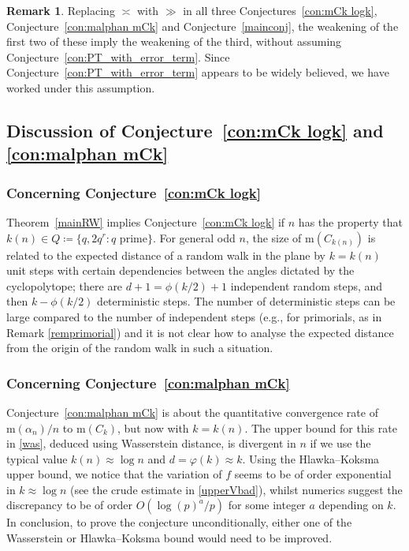 \documentclass[12pt,reqno]{amsart}
\theoremstyle{definition}
\theoremstyle{plain}
\theoremstyle{definition}
\newtheorem{remark}[theorem]{Remark}
\newcommand\m{\mathrm{m}}
\begin{document}
\begin{remark} Replacing $\asymp$ with $\gg$ in all three Conjectures~\ref{con:mCk logk}, Conjecture~\ref{con:malphan mCk} and Conjecture~\ref{mainconj}, the weakening of the first two of these imply the weakening of the third, without assuming Conjecture~\ref{con:PT_with_error_term}. Since Conjecture~\ref{con:PT_with_error_term} appears to be widely believed, we have worked under this assumption. 
\end{remark} 


\subsection{Discussion of Conjecture~\ref{con:mCk logk} and \ref{con:malphan mCk}}

\subsubsection*{Concerning Conjecture~\ref{con:mCk logk}} 
Theorem~\ref{mainRW} implies Conjecture~\ref{con:mCk logk} if $n$ has the property that $k(n) \in Q \coloneqq  \{ q, 2 q^r \colon q \text{ prime} \}$. For general odd $n$, the size of $\m(C_{k(n)})$ is related to the expected distance of a random walk in the plane by $k=k(n)$ unit steps with certain dependencies between the angles dictated by the cyclopolytope; there are $d+1=\phi(k/2)+1$ independent random steps, and then $k-\phi(k/2)$ deterministic steps. The number of deterministic steps can be large compared to the number of independent steps (e.g., for primorials, as in Remark \ref{remprimorial}) and it is not clear how to analyse the expected distance from the origin of the random walk in such a situation. 

\subsubsection*{Concerning Conjecture~\ref{con:malphan mCk}} 
Conjecture~\ref{con:malphan mCk} is about the quantitative convergence rate of $\m(\alpha_n)/n$ to $\m(C_k)$, but now with $k=k(n)$. The upper bound for this rate in \eqref{was}, deduced using Wasserstein distance, is divergent in $n$ if we use the typical value $k(n) \approx \log n$ and $d =\varphi(k) \approx k$.
Using the Hlawka--Koksma upper bound, we notice that the variation of $f$ seems to be of order exponential in $k  \approx \log n$ (see the crude estimate in  \eqref{upperVbad}), whilst numerics suggest the discrepancy to be of order $O(\log(p)^a/p)$ for some integer $a$ depending on $k$. In conclusion, to prove the conjecture unconditionally, either one of the Wasserstein or Hlawka--Koksma bound would need to be improved.
\end{document}
